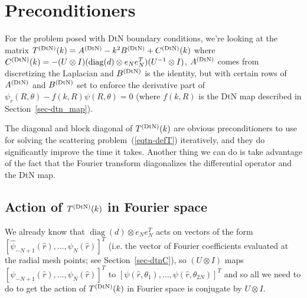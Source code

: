 \section{Preconditioners}
\label{sec-preconditioners}

For the problem posed with DtN boundary conditions,
we're looking at the matrix $T^{(\text{DtN})}(k) = A^{(\text{DtN})} - k^2 B^{(\text{DtN})} +C^{(\text{DtN})}(k)$ where
$C^{(\text{DtN})}(k) = -(U \otimes I)(\operatorname{diag}(d) \otimes e_Ne_N^T)(U^{-1} \otimes I)$,
$A^{(\text{DtN})}$ comes from discretizing the Laplacian and $B^{(\text{DtN})}$ is the
identity, but with certain rows of $A^{(\text{DtN})}$ and $B^{(\text{DtN})}$ set to
enforce the derivative part of
$\psi_r(R,\theta) - f(k,R)\psi(R,\theta) = 0$ (where
$f(k,R)$ is the DtN map described in Section~\ref{sec-dtn_map}).

The diagonal and block diagonal of $T^{(\text{DtN})}(k)$ are obvious preconditioners 
to use for solving the scattering problem~(\ref{eqtn-defT})
iteratively,
and they do significantly improve the time it takes. Another
thing we can do is take advantage of the fact that the Fourier transform
diagonalizes the differential operator and the DtN map. 

\subsection{Action of $T^{(\text{DtN})}(k)$ in Fourier space}

We already know
that $\operatorname{diag}(d) \otimes e_Ne_N^T$ acts on vectors of the form
$[\hat{\psi}_{-N+1}(\hat{r}), \hdots , \psi_N(\hat{r})]^T$ (i.e. the
vector of Fourier coefficients evaluated at the radial mesh
points; see Section~\ref{sec-dtnC}), so $(U \otimes I)$ maps
$[\psi_{-N+1}(\hat{r}), \hdots , \psi_N(\hat{r})]^T$ to
$[\psi(\hat{r},\theta_1), \hdots , \psi(\hat{r},\theta_{2N})]^T$
and so all we need to do to get the action of
$T^{(\text{DtN})}(k)$ in Fourier space is conjugate by
$U \otimes I$.

